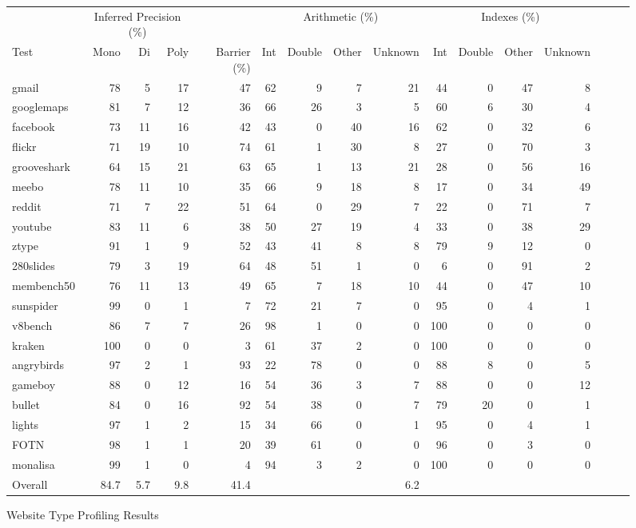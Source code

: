 \begin{figure*}
\begin{center}
\begin{tabular}{lrrrrrrrrrrrrrrr}
\toprule
& \multicolumn{3}{c}{Inferred Precision (\%)} &
& \multicolumn{4}{c}{Arithmetic (\%)}
& \multicolumn{4}{c}{Indexes (\%)} \\

\cmidrule(r){2-4}
\cmidrule(r){6-9}
\cmidrule{10-13}

Test
& Mono & Di & Poly & Barrier (\%)
& Int & Double & Other & Unknown
& Int & Double & Other & Unknown \\
\midrule
gmail          & 78 & 5  & 17 & 47 & 62 & 9  & 7  & 21 & 44 & 0 & 47 & 8 \\
googlemaps     & 81 & 7  & 12 & 36 & 66 & 26 & 3  & 5  & 60 & 6 & 30 & 4 \\
facebook       & 73 & 11 & 16 & 42 & 43 & 0 & 40 & 16 & 62 & 0 & 32 & 6 \\
flickr         & 71 & 19 & 10 & 74 & 61 & 1 & 30 & 8 & 27 & 0 & 70 & 3 \\
grooveshark    & 64 & 15 & 21 & 63 & 65 & 1 & 13 & 21 & 28 & 0 & 56 & 16 \\
meebo          & 78 & 11 & 10 & 35 & 66 & 9 & 18 & 8 & 17 & 0 & 34 & 49 \\
reddit         & 71 & 7 & 22 & 51 & 64 & 0 & 29 & 7 & 22 & 0 & 71 & 7 \\
youtube        & 83 & 11 & 6 & 38 & 50 & 27 & 19 & 4 & 33 & 0 & 38 & 29 \\
ztype          & 91 & 1 & 9 & 52 & 43 & 41 & 8 & 8 & 79 & 9 & 12 & 0 \\
280slides      & 79 & 3 & 19 & 64 & 48 & 51 & 1 & 0 & 6 & 0 & 91 & 2 \\
membench50     & 76 & 11 & 13 & 49 & 65 & 7  & 18 & 10 & 44 & 0 & 47 & 10 \\
\midrule
sunspider      & 99 & 0  & 1  & 7  & 72 & 21 & 7  & 0  & 95 & 0 & 4  & 1  \\
v8bench        & 86 & 7  & 7  & 26 & 98 & 1  & 0  & 0  & 100 & 0 & 0 & 0  \\
kraken         & 100 & 0 & 0  & 3  & 61 & 37 & 2  & 0  & 100 & 0 & 0 & 0  \\
\midrule
angrybirds     & 97 & 2 & 1 & 93 & 22 & 78 & 0 & 0 & 88 & 8 & 0 & 5 \\
gameboy        & 88 & 0 & 12 & 16 & 54 & 36 & 3 & 7 & 88 & 0 & 0 & 12 \\
bullet         & 84 & 0 & 16 & 92 & 54 & 38 & 0 & 7 & 79 & 20 & 0 & 1 \\
lights         & 97 & 1 & 2 & 15 & 34 & 66 & 0 & 1 & 95 & 0 & 4 & 1 \\
FOTN           & 98 & 1 & 1 & 20 & 39 & 61 & 0 & 0 & 96 & 0 & 3 & 0 \\
monalisa       & 99 & 1 & 0 & 4 & 94 & 3 & 2 & 0 & 100 & 0 & 0 & 0 \\
\midrule
Overall        & 84.7 & 5.7 & 9.8 & 41.4 & & & & 6.2 \\
\bottomrule
\end{tabular}
\end{center}
\nocaptionrule \caption{Website Type Profiling Results}
\end{figure*}


